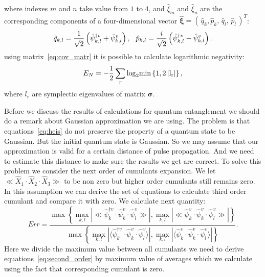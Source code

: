 \documentclass{osa-article}
\begin{document}
where indexes $m$ and $n$ take value from $1$ to $4$, and $\hat{\xi}_{m}$ and $\hat{\xi}_{n}$ are the corresponding components of a four-dimensional vector $\hat{\bm{\xi}}=\left(\,\hat{q}_{k},\hat{p}_{k},\,\hat{q}_{l},\,\hat{p}_{l}\,\right)^{T}$:
\begin{equation}\label{eq:qp}
	\hat{q}_{k,l}=\frac{1}{\sqrt{2}}\left(\hat{\psi}^{\dag v}_{k,l}+\hat{\psi}^{v}_{k,l}\right),\hspace{2.5mm}\hat{p}_{k,l}=\frac{i}{\sqrt{2}}\left(\hat{\psi}^{\dag v}_{k,l}-\hat{\psi}^{v}_{k,l}\right).
\end{equation}
using matrix~\eqref{eq:cov_matr} it is possible to calculate logarithmic negativity:
\begin{equation}\label{eq:EN}
	E_N = -\dfrac{1}{2}\sum_r \rm{log}_2 \rm{min}\left\{1, 2\left|l_r\right|\right\},
\end{equation}
where $l_r$ are symplectic eigenvalues of matrix $\bm{\sigma}$.
\par
Before we discuss the results of calculations for quantum entanglement we should do a remark about Gaussian approximation we are using. 
The problem is that equations~\eqref{eq:heis} do not preserve the property of a quantum state to be Gaussian. 
But the initial quantum state is Gaussian. 
So we may assume that our approximation is valid for a certain distance of pulse propagation. 
And we need to estimate this distance to make sure the results we get are correct.
To solve this problem we consider the next order of cumulants expansion. 
We let $\ll\hat{X}_1\cdot\hat{X}_2\cdot\hat{X}_3\gg$ to be non zero but higher order cumulants still remains zero.
In this assumption we can derive the set of equations to calculate third order cumulant and compare it with zero.
We calculate next quantity:
\begin{equation}
Err \!= \!\!\dfrac{\max\!\left\{\underset{k,l}{\max}\!\left|\ll\!\hat{\psi}^{\dag v}_{k}\!\cdot\!\hat{\psi}^{ v}_{k}\!\cdot\!\hat{\psi}^{ v}_{l}\!\!\gg\right|\!,\underset{k,l}{\max}\!\left|\ll\!\hat{\psi}^{ v}_{k}\!\cdot\!\hat{\psi}^{ v}_{k}\!\cdot\!\hat{\psi}^{ v}_{l}\!\!\gg\right|\right\}}
{\max\left\{\underset{k,l}{\max}\left|\langle\hat{\psi}^{\dag v}_{k}\!\cdot\!\hat{\psi}^{ v}_{k}\!\cdot\!\hat{\psi}^{ v}_{l}\rangle\right|,\underset{k,l}{\max}\left|\langle\hat{\psi}^{ v}_{k}\!\cdot\!\hat{\psi}^{ v}_{k}\!\cdot\!\hat{\psi}^{ v}_{l}\rangle\right|\right\}}\!.
\end{equation}
Here we divide the maximum value between all cumulants we need to derive equations~\eqref{eq:second_order} by maximum value of averages which we calculate using the fact that corresponding cumulant is zero.
\end{document}
